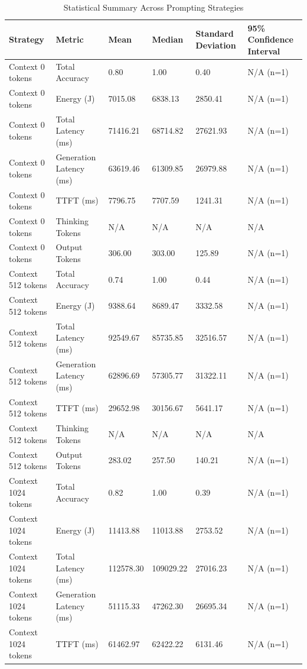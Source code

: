 \begin{table}
\caption{Statistical Summary Across Prompting Strategies}
\label{tab:statistical_summary}
\begin{tabular}{llllll}
\toprule
Strategy & Metric & Mean & Median & Standard Deviation & 95\% Confidence Interval \\
\midrule
Context 0 tokens & Total Accuracy & 0.80 & 1.00 & 0.40 & N/A (n=1) \\
Context 0 tokens & Energy (J) & 7015.08 & 6838.13 & 2850.41 & N/A (n=1) \\
Context 0 tokens & Total Latency (ms) & 71416.21 & 68714.82 & 27621.93 & N/A (n=1) \\
Context 0 tokens & Generation Latency (ms) & 63619.46 & 61309.85 & 26979.88 & N/A (n=1) \\
Context 0 tokens & TTFT (ms) & 7796.75 & 7707.59 & 1241.31 & N/A (n=1) \\
Context 0 tokens & Thinking Tokens & N/A & N/A & N/A & N/A \\
Context 0 tokens & Output Tokens & 306.00 & 303.00 & 125.89 & N/A (n=1) \\
Context 512 tokens & Total Accuracy & 0.74 & 1.00 & 0.44 & N/A (n=1) \\
Context 512 tokens & Energy (J) & 9388.64 & 8689.47 & 3332.58 & N/A (n=1) \\
Context 512 tokens & Total Latency (ms) & 92549.67 & 85735.85 & 32516.57 & N/A (n=1) \\
Context 512 tokens & Generation Latency (ms) & 62896.69 & 57305.77 & 31322.11 & N/A (n=1) \\
Context 512 tokens & TTFT (ms) & 29652.98 & 30156.67 & 5641.17 & N/A (n=1) \\
Context 512 tokens & Thinking Tokens & N/A & N/A & N/A & N/A \\
Context 512 tokens & Output Tokens & 283.02 & 257.50 & 140.21 & N/A (n=1) \\
Context 1024 tokens & Total Accuracy & 0.82 & 1.00 & 0.39 & N/A (n=1) \\
Context 1024 tokens & Energy (J) & 11413.88 & 11013.88 & 2753.52 & N/A (n=1) \\
Context 1024 tokens & Total Latency (ms) & 112578.30 & 109029.22 & 27016.23 & N/A (n=1) \\
Context 1024 tokens & Generation Latency (ms) & 51115.33 & 47262.30 & 26695.34 & N/A (n=1) \\
Context 1024 tokens & TTFT (ms) & 61462.97 & 62422.22 & 6131.46 & N/A (n=1) \\

\end{tabular}
\end{table}
